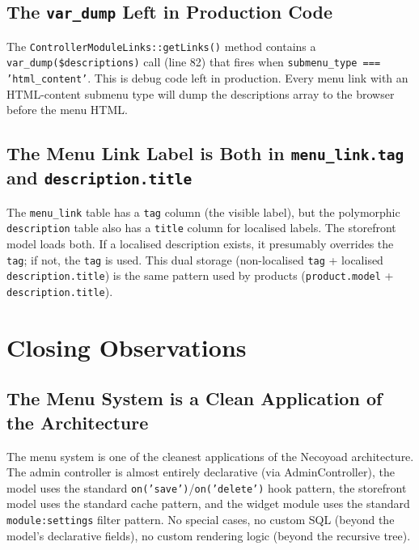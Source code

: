 \documentclass[11pt,a4paper]{article}
\begin{document}
\subsection{The \texttt{var\_dump} Left in Production Code}

\begin{findingbox}
The \texttt{ControllerModuleLinks::getLinks()} method contains a
\texttt{var\_dump(\$descriptions)} call (line 82) that fires when
\texttt{submenu\_type === 'html\_content'}. This is debug code
left in production. Every menu link with an HTML-content submenu
type will dump the descriptions array to the browser before the
menu HTML.
\end{findingbox}

\subsection{The Menu Link Label is Both in \texttt{menu\_link.tag} and \texttt{description.title}}

The \texttt{menu\_link} table has a \texttt{tag} column (the visible
label), but the polymorphic \texttt{description} table also has a
\texttt{title} column for localised labels. The storefront model
loads both. If a localised description exists, it presumably
overrides the \texttt{tag}; if not, the \texttt{tag} is used. This
dual storage (non-localised \texttt{tag} + localised
\texttt{description.title}) is the same pattern used by products
(\texttt{product.model} + \texttt{description.title}).

\section{Closing Observations}\label{sec:observations}

\subsection{The Menu System is a Clean Application of the Architecture}

The menu system is one of the cleanest applications of the Necoyoad
architecture. The admin controller is almost entirely declarative
(via AdminController), the model uses the standard
\texttt{on('save')}/\texttt{on('delete')} hook pattern, the
storefront model uses the standard cache pattern, and the widget
module uses the standard \texttt{module:settings} filter pattern.
No special cases, no custom SQL (beyond the model's declarative
fields), no custom rendering logic (beyond the recursive tree).
\end{document}
